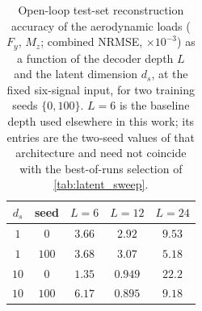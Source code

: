 \begin{table}[htbp]
\centering
\caption{Open-loop test-set reconstruction accuracy of the aerodynamic loads
($F_y$, $M_z$; combined NRMSE, $\times10^{-3}$) as a function of the decoder
depth $L$ and the latent dimension $d_s$, at the fixed six-signal input, for two
training seeds $\{0,100\}$. $L=6$ is the baseline depth used elsewhere in this
work; its entries are the two-seed values of that architecture and need not
coincide with the best-of-runs selection of \cref{tab:latent_sweep}.}
\label{tab:depth_loads}
\begin{tabular}{cc ccc}
\hline
\rowcolor{bluePoli!40}
$d_s$ & seed & $L=6$ & $L=12$ & $L=24$ \T\B \\
\hline\hline
$1$  & $0$   & $3.66$ & $2.92$ & $9.53$ \T\B \\
$1$  & $100$ & $3.68$ & $3.07$ & $5.18$ \T\B \\
\hline
$10$ & $0$   & $1.35$ & $0.949$ & $22.2$ \T\B \\
$10$ & $100$ & $6.17$ & $0.895$ & $9.18$ \B \\
\hline
\end{tabular}
\end{table}
